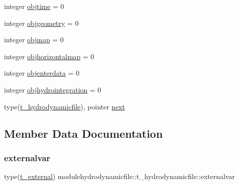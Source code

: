 \begin{DoxyCompactItemize}
\item 
integer \mbox{\hyperlink{structmodulehydrodynamicfile_1_1t__hydrodynamicfile_a19f5d902bdecfe7696a4230f9e18e27d}{objtime}} = 0
\item 
integer \mbox{\hyperlink{structmodulehydrodynamicfile_1_1t__hydrodynamicfile_a7a943fd36e2418b03801551f38443c48}{objgeometry}} = 0
\item 
integer \mbox{\hyperlink{structmodulehydrodynamicfile_1_1t__hydrodynamicfile_a31f1334ed49826a2cc760acf7548f740}{objmap}} = 0
\item 
integer \mbox{\hyperlink{structmodulehydrodynamicfile_1_1t__hydrodynamicfile_a71b4db8ae36ff44f595c036fe2fd8879}{objhorizontalmap}} = 0
\item 
integer \mbox{\hyperlink{structmodulehydrodynamicfile_1_1t__hydrodynamicfile_a6992a37b472fae4705789ea40169474c}{objenterdata}} = 0
\item 
integer \mbox{\hyperlink{structmodulehydrodynamicfile_1_1t__hydrodynamicfile_ac972d1efb6a1023ca59c154d6ffbf21c}{objhydrointegration}} = 0
\item 
type(\mbox{\hyperlink{structmodulehydrodynamicfile_1_1t__hydrodynamicfile}{t\+\_\+hydrodynamicfile}}), pointer \mbox{\hyperlink{structmodulehydrodynamicfile_1_1t__hydrodynamicfile_a01071d327cfcf75aa132b4800d07aa01}{next}}
\end{DoxyCompactItemize}


\subsection{Member Data Documentation}
\mbox{\label{structmodulehydrodynamicfile_1_1t__hydrodynamicfile_a7109b9e4b8c39affdc994a2d788937c5}} 
\subsubsection{\texorpdfstring{externalvar}{externalvar}}
{\footnotesize\ttfamily type(\mbox{\hyperlink{structmodulehydrodynamicfile_1_1t__external}{t\+\_\+external}}) modulehydrodynamicfile\+::t\+\_\+hydrodynamicfile\+::externalvar\hspace{0.3cm}{\ttfamily [private]}}

